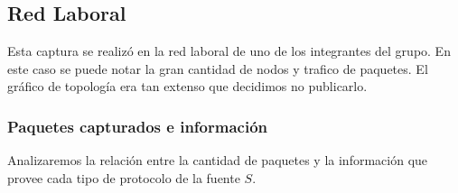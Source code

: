 \subsection{Red Laboral}

Esta captura se realizó en la red laboral de uno de los integrantes del grupo. En este caso se puede notar la gran cantidad de nodos y trafico de paquetes.
El gráfico de topología era tan extenso que decidimos no publicarlo.

\FloatBarrier

\subsubsection{Paquetes capturados e información}

Analizaremos la relación entre la cantidad de paquetes y la información que provee cada tipo de protocolo de la fuente $S$.

